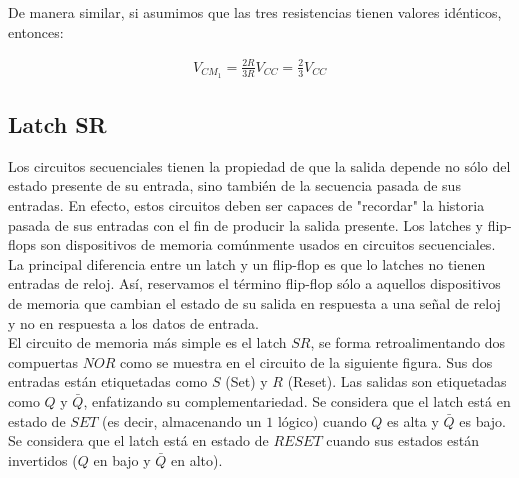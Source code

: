 \documentclass{article}
\begin{document}
De manera similar, si asumimos que las tres resistencias tienen valores idénticos, entonces:

\begin{align}
	V_{CM_1} = \frac{2R}{3R}V_{CC} = \frac{2}{3}V_{CC}
\end{align}

\subsection*{Latch SR}
Los circuitos secuenciales tienen la propiedad de que la salida depende no sólo del estado presente de su entrada, sino también de la secuencia pasada de sus entradas. En efecto, estos circuitos deben ser capaces de "recordar" la historia pasada de sus entradas con el fin de producir la salida presente. Los latches y flip-flops son dispositivos de memoria comúnmente usados en circuitos secuenciales. La principal diferencia entre un latch y un flip-flop es que lo latches no tienen entradas de reloj. Así, reservamos el término flip-flop sólo a aquellos dispositivos de memoria que cambian el estado de su salida en respuesta a una señal de reloj y no en respuesta a los datos de entrada. \\

\noindent El circuito de memoria más simple es el latch $SR$, se forma retroalimentando dos compuertas $NOR$ como se muestra en el circuito de la siguiente figura. Sus dos entradas están etiquetadas como $S$ (Set) y $R$ (Reset). Las salidas son etiquetadas como $Q$ y $\bar{Q}$, enfatizando su complementariedad. Se considera que el latch está en estado de $SET$ (es decir, almacenando un $1$ lógico) cuando $Q$ es alta y $\bar{Q}$ es bajo. Se considera que el latch está en estado de $RESET$ cuando sus estados están invertidos ($Q$ en bajo y $\bar{Q}$ en alto).
\end{document}

